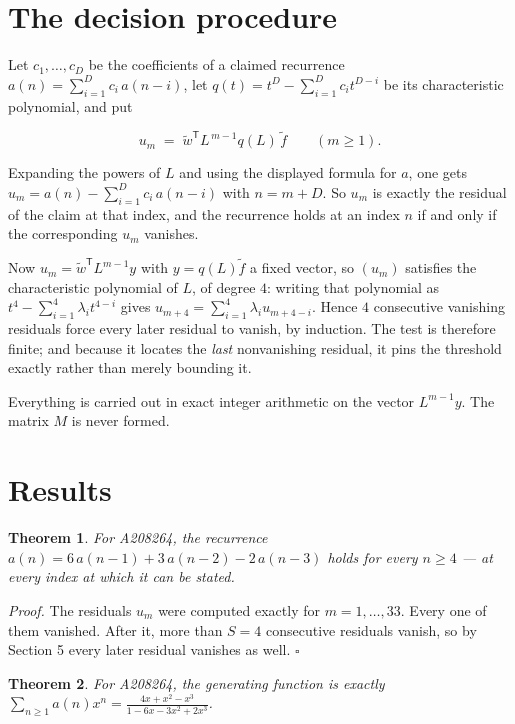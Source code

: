 \documentclass[11pt]{article}
\newtheorem{theorem}{Theorem}
\theoremstyle{definition}
\begin{document}
\section{The decision procedure}

Let $c_1,\dots,c_D$ be the coefficients of a claimed recurrence $a(n) = \sum_{i=1}^{D} c_i\,a(n-i)$, let $q(t) = t^{D} - \sum_{i=1}^{D} c_i t^{D-i}$ be its characteristic polynomial, and put

\[u_m \;=\; \tilde w^{\mathsf T} L^{\,m-1} q(L)\,\tilde f \qquad (m \ge 1).\]

Expanding the powers of $L$ and using the displayed formula for $a$, one gets $u_m = a(n) - \sum_{i=1}^{D} c_i\,a(n-i)$ with $n = m + D$. So $u_m$ is exactly the residual of the claim at that index, and the recurrence holds at an index $n$ if and only if the corresponding $u_m$ vanishes.

Now $u_m = \tilde w^{\mathsf T} L^{m-1} y$ with $y = q(L)\tilde f$ a fixed vector, so $(u_m)$ satisfies the characteristic polynomial of $L$, of degree $4$: writing that polynomial as $t^{4} - \sum_{i=1}^{4} \lambda_i t^{4-i}$ gives $u_{m+4} = \sum_{i=1}^{4} \lambda_i u_{m+4-i}$. Hence $4$ consecutive vanishing residuals force every later residual to vanish, by induction. The test is therefore finite; and because it locates the {\itshape last} nonvanishing residual, it pins the threshold exactly rather than merely bounding it.

Everything is carried out in exact integer arithmetic on the vector $L^{m-1}y$. The matrix $M$ is never formed.

\section{Results}

\begin{theorem} For A208264, the recurrence $a(n) = 6\,a(n-1) + 3\,a(n-2) - 2\,a(n-3)$ holds for every $n \ge 4$ --- at every index at which it can be stated.\end{theorem}

{\itshape Proof.} The residuals $u_m$ were computed exactly for $m = 1,\dots,33$. Every one of them vanished. After it, more than $S = 4$ consecutive residuals vanish, so by Section 5 every later residual vanishes as well. $\square$

\begin{theorem} For A208264, the generating function is exactly $\sum_{n\ge 1} a(n)x^n = \frac{4x + x^{2} - x^{3}}{1 - 6x - 3x^{2} + 2x^{3}}$.\end{theorem}
\end{document}
